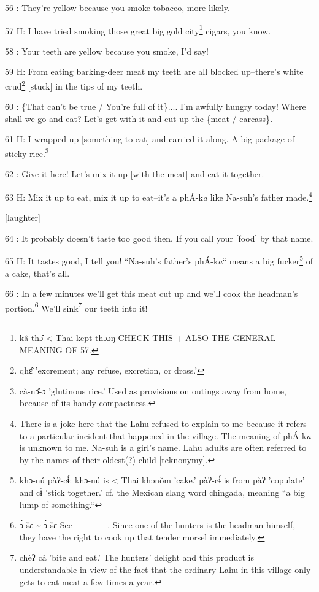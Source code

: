 56  : They're yellow because you smoke tobacco, more likely.

57 H: I have tried smoking those great big gold city\footnote{kâ-thɔ̂ < Thai kept thɔɔŋ CHECK THIS + ALSO THE GENERAL MEANING OF 57.} cigars, you know.

58  : Your teeth are yellow because you smoke, I'd say!

59 H: From eating barking-deer meat my teeth are all blocked up--there's white
crud\footnote{qhɛ̂ 'excrement; any refuse, excretion, or dross.'} [stuck] in the tips of my teeth.

60  : \{That can't be true / You're full of it\}.... I'm awfully hungry today!
Where shall we go and eat? Let's get with it and cut up the \{meat / carcass\}.

61 H: I wrapped up [something to eat] and carried it along. A big package of sticky
rice.\footnote{cà-nɔ̂-\emph{ɔ} 'glutinous rice.' Used as provisions on outings away from home, because of its handy compactness.}

62  : Give it here! Let's mix it up [with the meat] and eat it together.

63 H: Mix it up to eat, mix it up to eat--it's a phÁ-k\emph{a} like Na-suh's father
made.\footnote{There is a joke here that the Lahu refused to explain to me because it refers to a particular incident that happened in the village. The meaning of phÁ-k\emph{a} is unknown to me. Na-suh is a girl's name. Lahu adults are often referred to by the names of their oldest(?) child [teknonymy].}

[laughter]

64  : It probably doesn't taste too good then. If you call your [food] by that
name.

65 H: It tastes good, I tell you! ``Na-suh's father's phÁ-k\emph{a}``
means a big fucker\footnote{khɔ-nú pàʔ-cɨ́: khɔ-nú is < Thai khənǒm 'cake.' pàʔ-cɨ́ is from pàʔ 'copulate' and cɨ́ 'stick together.' cf. the Mexican slang word chingada, meaning ``a big lump of something.``} of a cake, that's all.

66  : In a few minutes we'll get this meat cut up and we'll cook the headman's
portion.\footnote{ɔ̀-š\emph{ɛ} \textasciitilde{} ɔ̀-šɛ See \_\_\_\_\_. Since one of the hunters is the headman himself, they have the right to cook up that tender morsel immediately.} We'll sink\footnote{chèʔ câ 'bite and eat.' The hunters' delight and this product is understandable in view of the fact that the ordinary Lahu in this village only gets to eat meat a few times a year.} our teeth into it!

